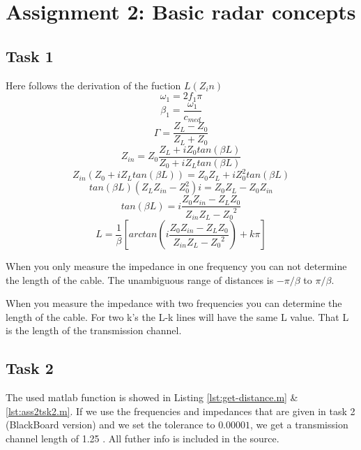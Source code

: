 \documentclass[final]{scrreprt} %
\begin{document}
\chapter{Assignment 2: Basic radar concepts}
\label{ch:sk5-ass2}
\section{Task 1}
\label{sec:sk5-tsk1}
Here follows the derivation of the fuction $L(Z_in)$
\begin{equation}
\omega_{1}=2f_1\pi
\end{equation}
\begin{equation}
\beta_{1}=\frac{\omega_{1}}{c_{med}}
\end{equation}
\begin{equation}
\Gamma=\frac{Z_L-Z_0}{Z_L+Z_0}
\end{equation}
\begin{equation}
{Z}_{in}=Z_0\frac{Z_L+iZ_0tan(\beta L)}{Z_0+iZ_Ltan(\beta L)}
\end{equation}
\begin{equation}
{Z}_{in} \left(Z_0 + i Z_L tan(\beta L)\right)=Z_0 Z_L+iZ_0^2 tan(\beta L)
\end{equation}
\begin{equation}
tan(\beta L) (Z_L Z_{in}-Z_0^2) i=Z_0 Z_L-Z_0 Z_{in}
\end{equation}
\begin{equation}
tan(\beta L)=i\frac{Z_0 Z_{in} - Z_L Z_0}{Z_{in} Z_L - {Z_0}^2}
\end{equation}
\begin{equation}
L=\frac{1}{\beta}\left[arctan\left(i\frac{Z_0 Z_{in} - Z_L Z_0}{Z_{in} Z_L - {Z_0}^2}\right)+k\pi\right]
\end{equation}

When you only measure the impedance in one frequency you can not determine the length of the cable.
The unambiguous range of distances is $-\pi/\beta$ to $\pi/\beta$.

When you measure the impedance with two frequencies you can determine the length of the cable.
For two k's the L-k lines will have the same L value. That L is the length of the transmission channel.

\section{Task 2}
\label{sec:sk5-tsk2}
The used matlab function is showed in Listing \ref{lst:get-distance.m} \& \ref{lst:ass2tsk2.m}.
If we use the frequencies and impedances that are given in task 2 (BlackBoard version) and we set the tolerance to $0.00001$, we get a transmission channel length of 1.25 \meter.
All futher info is included in the source.
\end{document}
